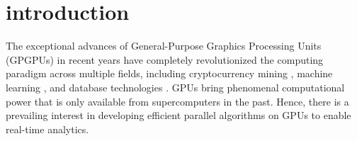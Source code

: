 \section{introduction}
The exceptional advances of General-Purpose Graphics Processing Units (GPGPUs) 
in recent years have completely revolutionized the computing paradigm across multiple fields, including cryptocurrency mining \cite{o2014bitcoin,taylor2013bitcoin}, machine learning \cite{coates2013deep,abadi2016tensorflow}, and database technologies \cite{bakkum2010accelerating,kaldewey2012gpu}.
GPUs bring phenomenal computational power that is only available from supercomputers in the past. 
Hence, there is a prevailing interest in developing efficient parallel algorithms on GPUs to enable real-time analytics.

